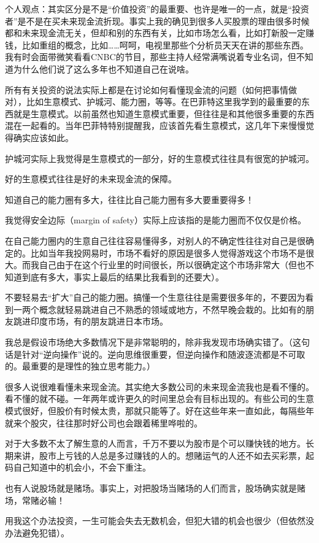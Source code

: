 个人观点：其实区分是不是“价值投资”的最重要、也许是唯一的一点，就是“投资者”是不是在买未来现金流折现。事实上我的确见到很多人买股票的理由很多时候都和未来现金流无关，但却和别的东西有关，比如市场怎么看，比如打新股一定赚钱，比如重组的概念，比如……呵呵，电视里那些个分析员天天在讲的那些东西。我有时会面带微笑看看CNBC的节目，那些主持人经常满嘴说着专业名词，但不知道为什么他们说了这么多年也不知道自己在说啥。

所有有关投资的说法实际上都是在讨论如何看懂现金流的问题（如何把事情做对），比如生意模式、护城河、能力圈，等等。在巴菲特这里我学到的最重要的东西就是生意模式。以前虽然也知道生意模式重要，但往往是和其他很多重要的东西混在一起看的。当年巴菲特特别提醒我，应该首先看生意模式，这几年下来慢慢觉得确实应该如此。

护城河实际上我觉得是生意模式的一部分，好的生意模式往往具有很宽的护城河。

好的生意模式往往是好的未来现金流的保障。

知道自己的能力圈有多大，往往比自己能力圈有多大要重要得多！

我觉得安全边际（margin of safety）实际上应该指的是能力圈而不仅仅是价格。

在自己能力圈内的生意自己往往容易懂得多，对别人的不确定性往往对自己是很确定的。比如当年我投网易时，市场不看好的原因是很多人觉得游戏这个市场不是很大。而我自己由于在这个行业里的时间很长，所以很确定这个市场非常大（但也不知道到底有多大，事实上最后的结果比我看到的还要大）。

不要轻易去“扩大”自己的能力圈。搞懂一个生意往往是需要很多年的，不要因为看到一两个概念就轻易跳进自己不熟悉的领域或地方，不然早晚会栽的。比如有的朋友跳进印度市场，有的朋友跳进日本市场。

我总是假设市场绝大多数情况下是非常聪明的，除非我发现市场确实错了。（这句话是针对“逆向操作”说的。逆向思维很重要，但逆向操作和随波逐流都是不可取的。最重要的是理性的独立思考能力。）

很多人说很难看懂未来现金流。其实绝大多数公司的未来现金流我也是看不懂的。看不懂的就不碰。一年两年或许更久的时间里总会有目标出现的。有些公司的生意模式很好，但股价有时候太贵，那就只能等了。好在这些年来一直如此，每隔些年就来个股灾，往往那时好公司也会跟着稀里哗啦的。

对于大多数不太了解生意的人而言，千万不要以为股市是个可以赚快钱的地方。长期来讲，股市上亏钱的人总是多过赚钱的人的。想赌运气的人还不如去买彩票，起码自己知道中的机会小，不会下重注。

也有人说股场就是赌场。事实上，对把股场当赌场的人们而言，股场确实就是赌场，常赌必输！

用我这个办法投资，一生可能会失去无数机会，但犯大错的机会也很少（但依然没办法避免犯错）。

